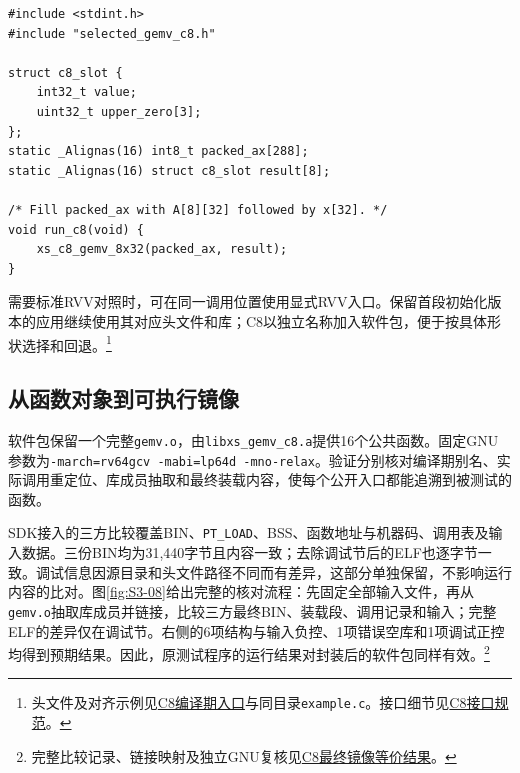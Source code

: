 \begin{Verbatim}[fontsize=\small,breaklines=true]
#include <stdint.h>
#include "selected_gemv_c8.h"

struct c8_slot {
    int32_t value;
    uint32_t upper_zero[3];
};
static _Alignas(16) int8_t packed_ax[288];
static _Alignas(16) struct c8_slot result[8];

/* Fill packed_ax with A[8][32] followed by x[32]. */
void run_c8(void) {
    xs_c8_gemv_8x32(packed_ax, result);
}
\end{Verbatim}

需要标准RVV对照时，可在同一调用位置使用显式RVV入口。保留首段初始化版本的应用继续使用其对应头文件和库；C8以独立名称加入软件包，便于按具体形状选择和回退。\footnote{头文件及对齐示例见\href{https://github.com/cc77-builder/riscv/blob/a0f13456e0c3180fe9c4023f5cbe7874eb5d35a9/team/optimizations/o2/integration/firstdot-v2-0f/package/c8/public/selected_gemv_c8.h}{C8编译期入口}与同目录\texttt{example.c}。接口细节见\href{https://github.com/cc77-builder/riscv/blob/a0f13456e0c3180fe9c4023f5cbe7874eb5d35a9/team/optimizations/o2/integration/firstdot-v2-0f/package/c8/CONTRACT.md}{C8接口规范}。}

\subsection{从函数对象到可执行镜像}

软件包保留一个完整\texttt{gemv.o}，由\texttt{libxs\_gemv\_c8.a}提供16个公共函数。固定GNU参数为\texttt{-march=rv64gcv -mabi=lp64d -mno-relax}。验证分别核对编译期别名、实际调用重定位、库成员抽取和最终装载内容，使每个公开入口都能追溯到被测试的函数。

SDK接入的三方比较覆盖BIN、\texttt{PT\_LOAD}、BSS、函数地址与机器码、调用表及输入数据。三份BIN均为31,440字节且内容一致；去除调试节后的ELF也逐字节一致。调试信息因源目录和头文件路径不同而有差异，这部分单独保留，不影响运行内容的比对。图\ref{fig:S3-08}给出完整的核对流程：先固定全部输入文件，再从\texttt{gemv.o}抽取库成员并链接，比较三方最终BIN、装载段、调用记录和输入；完整ELF的差异仅在调试节。右侧的6项结构与输入负控、1项错误空库和1项调试正控均得到预期结果。因此，原测试程序的运行结果对封装后的软件包同样有效。\footnote{完整比较记录、链接映射及独立GNU复核见\href{https://github.com/cc77-builder/riscv/blob/cfb0010f379f13ac7732dfb98ae600cc7ee1d44b/team/optimizations/o2/integration/firstdot-v2-0f/package/c8/relink/RESULT.md}{C8最终镜像等价结果}。}



